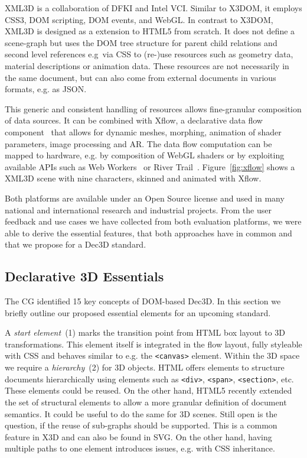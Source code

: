 \documentclass{acmsiggraph}
\begin{document}
XML3D \cite{Sons2010} is a collaboration of DFKI and Intel VCI. Similar to X3DOM, it employs CSS3, DOM scripting, DOM events, and WebGL. In contrast to X3DOM, XML3D is designed as a extension to HTML5 from scratch. It does not define a scene-graph but uses the DOM tree structure for parent child relations and second level references e.g\ via CSS to (re-)use resources such as geometry data, material descriptions or animation data. These resources are not necessarily in the same document, but can also come from external documents in various formats, e.g. as JSON. %

This generic and consistent handling of resources allows fine-granular composition of data sources. It can be combined with Xflow, a declarative data flow component~\cite{KleinSJRSB12} that allows for dynamic meshes, morphing, animation of shader parameters, image processing and AR. The data flow computation can be mapped to hardware, e.g. by composition of WebGL shaders or by exploiting available APIs such as Web Workers~\cite{w3c:webworkers} or River Trail~\cite{Herhut:2012}. Figure~\ref{fig:xflow} shows a XML3D scene with nine characters, skinned and animated with Xflow.

Both platforms are available under an Open Source license and used in many national and international research and industrial projects. From the user feedback and use cases we have collected from both evaluation platforms, we were able to derive the essential features, that both approaches have in common and that we propose for a Dec3D standard.


\subsection{Declarative 3D Essentials}
\label{subsection:essentials}

The CG identified 15 key concepts of DOM-based Dec3D. In this section we briefly outline our proposed essential elements for an upcoming standard. 

A \textit{start element}~(1) marks the transition point from HTML box layout to 3D transformations. This element itself is integrated in the flow layout, fully styleable with CSS and behaves similar to e.g. the \verb|<canvas>| element. Within the 3D space we require a \textit{hierarchy}~(2) for 3D objects. HTML offers elements to structure documents hierarchically using elements such as \verb|<div>|, \verb|<span>|, \verb|<section>|, etc. These elements could be reused. On the other hand, HTML5 recently extended the set of structural elements to allow a more granular definition of document semantics. It could be useful to do the same for 3D scenes. Still open is the question, if the reuse of sub-graphs should be supported. This is a common feature in X3D and can also be found in SVG. On the other hand, having multiple paths to one element introduces issues, e.g. with CSS inheritance. 
\end{document}
